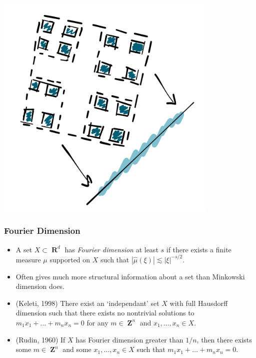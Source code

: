 \documentclass[usenames,dvipsnames]{beamer}
\DeclareMathOperator{\RR}{\textbf{R}}
\DeclareMathOperator{\ZZ}{\textbf{Z}}
\begin{document}
\begin{frame}

\begin{center}
\includegraphics[width=0.8\textwidth]{../Images/CantorDustProjection}
\end{center}

\end{frame}





\begin{frame}
    \frametitle{Fourier Dimension}

    \begin{itemize}
        \pause
        \item A set $X \subset \RR^d$ has \emph{Fourier dimension} at least $s$ if there exists a finite measure $\mu$ supported on $X$ such that $|\widehat{\mu}(\xi)| \lesssim |\xi|^{-s/2}$.

        \pause
        \item Often gives much more structural information about a set than Minkowski dimension does.

        \pause
        \item (Keleti, 1998) There exist an `independant' set $X$ with full Hausdorff dimension such that there exists no nontrivial solutions to $m_1x_1 + \dots + m_nx_n = 0$ for any $m \in \ZZ^n$ and $x_1, \dots, x_n \in X$.

        \pause
        \item (Rudin, 1960) If $X$ has Fourier dimension greater than $1/n$, then there exists some $m \in \ZZ^n$ and some $x_1, \dots, x_n \in X$ such that $m_1 x_1 + \dots + m_n x_n = 0$.
    \end{itemize}
\end{frame}
\end{document}
